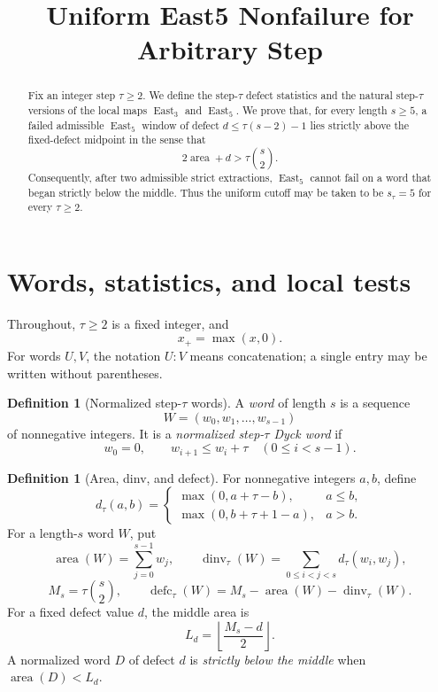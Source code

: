 \documentclass[11pt]{article}
\title{Uniform East5 Nonfailure for Arbitrary Step}
\author{}
\date{}
\theoremstyle{definition}
\newtheorem{definition}[theorem]{Definition}
\theoremstyle{remark}
\newcommand{\area}{\operatorname{area}}
\newcommand{\dinv}{\operatorname{dinv}}
\newcommand{\defc}{\operatorname{defc}}
\newcommand{\East}{\operatorname{East}}
\begin{document}
\maketitle

\begin{abstract}
Fix an integer step \(\tau\ge2\).  We define the step-\(\tau\) defect
statistics and the natural step-\(\tau\) versions of the local maps
\(\East_3\) and \(\East_5\).  We prove that, for every length \(s\ge5\),
a failed admissible \(\East_5\) window of defect
\(d\le\tau(s-2)-1\) lies strictly above the fixed-defect midpoint in the
sense that
\[
  2\area+d>\tau\binom{s}{2}.
\]
Consequently, after two admissible strict extractions, \(\East_5\) cannot
fail on a word that began strictly below the middle.  Thus the uniform
cutoff may be taken to be \(s_\tau=5\) for every \(\tau\ge2\).
\end{abstract}

\section{Words, statistics, and local tests}

Throughout, \(\tau\ge2\) is a fixed integer, and
\[
  x_+=\max(x,0).
\]
For words \(U,V\), the notation \(U:V\) means concatenation; a single
entry may be written without parentheses.

\begin{definition}[Normalized step-\(\tau\) words]
A \emph{word} of length \(s\) is a sequence
\[
  W=(w_0,w_1,\ldots,w_{s-1})
\]
of nonnegative integers.  It is a \emph{normalized step-\(\tau\) Dyck
word} if
\[
  w_0=0,
  \qquad
  w_{i+1}\le w_i+\tau
  \quad(0\le i<s-1).
\]
\end{definition}

\begin{definition}[Area, dinv, and defect]
For nonnegative integers \(a,b\), define
\[
  d_\tau(a,b)=
  \begin{cases}
    \max(0,a+\tau-b),&a\le b,\\[2mm]
    \max(0,b+\tau+1-a),&a>b.
  \end{cases}
\]
For a length-\(s\) word \(W\), put
\[
  \area(W)=\sum_{j=0}^{s-1}w_j,
  \qquad
  \dinv_\tau(W)=\sum_{0\le i<j<s}d_\tau(w_i,w_j),
\]
\[
  M_s=\tau\binom{s}{2},
  \qquad
  \defc_\tau(W)=M_s-\area(W)-\dinv_\tau(W).
\]
For a fixed defect value \(d\), the middle area is
\[
  L_d=\left\lfloor\frac{M_s-d}{2}\right\rfloor.
\]
A normalized word \(D\) of defect \(d\) is \emph{strictly below the
middle} when \(\area(D)<L_d\).
\end{definition}
\end{document}
